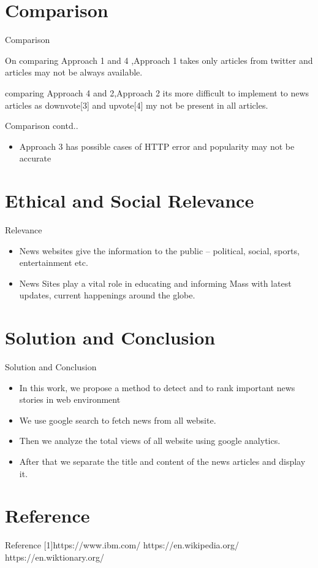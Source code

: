 \documentclass{beamer}
\begin{document}
	\section{Comparison}
	\begin{frame}{Comparison}
	\begin{itemize}
            \item \Large{On comparing Approach 1 and 4 ,Approach 1 takes only articles from twitter and articles may not be always available.      
            \item comparing Approach 4 and 2,Approach 2 its more difficult to implement to news articles as downvote[3] and upvote[4] my not be present in all articles.}
  	    \end{itemize}
  	 \end{frame}
    \begin{frame}{Comparison contd..}
        \begin{itemize}
            \item \Large {Approach 3 has  possible cases of HTTP error and popularity may not be accurate}
        \end{itemize}
	\end{frame}
	\section{Ethical and Social Relevance}
	\begin{frame}{Relevance}
	\begin{itemize}
	    \item \Large{News websites give the information to the public – political, social, sports, entertainment etc.}
	    \item \large{News Sites play a vital role in educating and informing Mass with latest updates, current happenings around the globe.}
	\end{itemize}
	\end{frame}

	\section{Solution and Conclusion}
	
	\begin{frame}{Solution and Conclusion}
	\begin{itemize}
	
	\item \Large In this work, we propose a method to detect and to rank important news stories in web environment
	\item \Largeuse  We use google search to fetch news from all website.
	\item \Largeuse  Then we analyze the total views of all website using google analytics.
	\item \Largeuse  After that we separate the title and content of the news articles and display it.
	\end{itemize}
	\end{frame}
	
	\section{Reference}
	\begin{frame}{Reference}
	    [1]https://www.ibm.com/
	    \newline
	    [2]https://en.wikipedia.org/
	    \newline
	    [3]https://en.wiktionary.org/
	     \end{frame}
\end{document}

